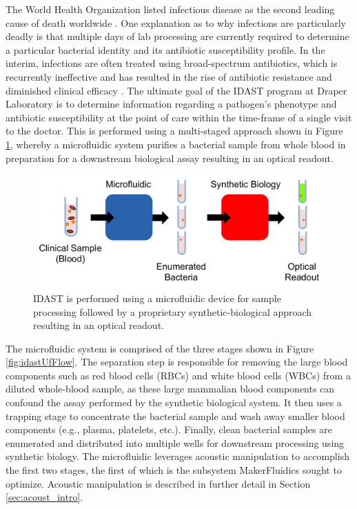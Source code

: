The World Health Organization listed infectious disease as the second leading cause of death worldwide \cite{world2004world}. One explanation as to why infections are particularly deadly is that multiple days of lab processing are currently required to determine a particular bacterial identity and its antibiotic susceptibility profile. In the interim, infections are often treated using broad-spectrum antibiotics, which is recurrently ineffective and has resulted in the rise of antibiotic resistance and diminished clinical efficacy \cite{laxminarayan2013antibiotic}. The ultimate goal of the IDAST program at Draper Laboratory is to determine information regarding a pathogen's phenotype and antibiotic susceptibility at the point of care within the time-frame of a single visit to the doctor. This is performed using a multi-staged approach shown in Figure \ref{fig:idastFlow}, whereby a microfluidic system purifies a bacterial sample from whole blood in preparation for a downstream biological assay resulting in an optical readout.

\begin{figure}[h]
  \begin{minipage}[t]{0.99\linewidth}\centering
    \includegraphics[width=13cm]{idastFlow.pdf}
    \medskip
  \end{minipage}\hfill
  \caption[System-level view of IDAST]{IDAST is performed using a microfluidic device for sample processing followed by a proprietary synthetic-biological approach resulting in an optical readout.}
    \label{fig:idastFlow}
\end{figure}

The microfluidic system is comprised of the three stages shown in Figure \ref{fig:idastUfFlow}. The separation step is responsible for removing the large blood components such as red blood cells (RBCs) and white blood cells (WBCs) from a diluted whole-blood sample, as these large mammalian blood components can confound the assay performed by the synthetic biological system. It then uses a trapping stage to concentrate the bacterial sample and wash away smaller blood components (e.g., plasma, platelets, etc.). Finally, clean bacterial samples are enumerated and distributed into multiple wells for downstream processing using synthetic biology. The microfluidic leverages acoustic manipulation to accomplish the first two stages, the first of which is the subsystem MakerFluidics sought to optimize. Acoustic manipulation is described in further detail in Section \ref{sec:acoust_intro}.

